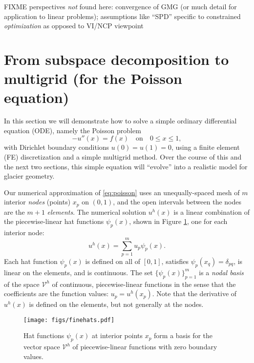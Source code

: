 \documentclass[letterpaper,final,12pt,reqno]{amsart}
\begin{document}
FIXME perspectives \emph{not} found here: convergence of GMG (or much detail for application to linear problems); assumptions like ``SPD'' specific to constrained \emph{optimization} as opposed to VI/NCP viewpoint


\section{From subspace decomposition to multigrid (for the Poisson equation)} \label{sec:subspace}

In this section we will demonstrate how to solve a simple ordinary differential equation (ODE), namely the Poisson problem
\begin{equation}
- u''(x) = f(x) \quad \text{on} \quad 0 \le x \le 1, \label{eq:poisson}
\end{equation}
with Dirichlet boundary conditions $u(0)=u(1)=0$, using a finite element (FE) discretization and a simple multigrid method.  Over the course of this and the next two sections, this simple equation will ``evolve'' into a realistic model for glacier geometry.

Our numerical approximation of \eqref{eq:poisson} uses an unequally-spaced mesh of $m$ interior \emph{nodes} (points) $x_p$ on $(0,1)$, and the open intervals between the nodes are the $m+1$ \emph{elements}.  The numerical solution $u^h(x)$ is a linear combination of the piecewise-linear hat functions $\psi_p(x)$, shown in Figure \ref{fig:finehats}, one for each interior node:
\begin{equation}
u^h(x) = \sum_{p=1}^m u_p \psi_p(x). \label{eq:trialsolution}
\end{equation}
Each hat function $\psi_p(x)$ is defined on all of $[0,1]$, satisfies $\psi_p(x_q) = \delta_{pq}$, is linear on the elements, and is continuous.  The set $\{\psi_p(x)\}_{p=1}^m$ is a \emph{nodal basis} of the space $\mathcal{V}^h$ of continuous, piecewise-linear functions in the sense that the coefficients are the function values: $u_p=u^h(x_p)$.  Note that the derivative of $u^h(x)$ is defined on the elements, but not generally at the nodes.

\begin{figure}
\texttt{[image: figs/finehats.pdf]}
\caption{Hat functions $\psi_p(x)$ at interior points $x_p$ form a basis for the vector space $\mathcal{V}^h$ of piecewise-linear functions  with zero boundary values.}
\label{fig:finehats}
\end{figure}
\end{document}
